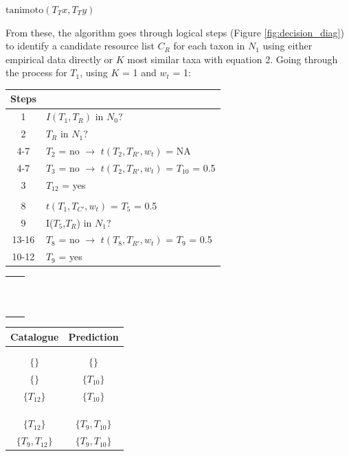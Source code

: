 \documentclass[letterpaper]{article}
\begin{document}
    \centerline{$\mbox{tanimoto}(T_Tx, T_Ty)$}
\bigskip

From these, the algorithm goes through logical steps (Figure \ref{fig:decision_diag}) to identify a candidate resource list $C_R$ for each taxon in $N_1$ using either empirical data directly or $K$ most similar taxa with equation 2. Going through the process for $T_1$, using $K$ = 1 and $w_t$ = 1:
\bigskip

\begin{table}[h!]
  \centering
  \small
  \begin{tabular}{cl}
      Steps \\
      \hline
      1        &$I(T_1,T_R)$ in $N_0$? \\
      2        &$T_R$ in $N_1$? \\
      4-7      &$T_2$ = no $\rightarrow$ $t(T_2, T_{R'}, w_t)$ = NA   \\
      4-7      &$T_3$ = no $\rightarrow$ $t(T_2, T_{R'}, w_t)$ = $T_{10}$ = 0.5 \\
      3        &$T_{12}$ = yes    \\  \\
      8        &$t(T_1, T_{C'}, w_t)$ = $T_5$ = 0.5            \\
      9        &I($T_5$,$T_R$) in $N_1$? \\
      13-16    &$T_8$ = no $\rightarrow$ $t(T_8, T_{R'}, w_t)$ = $T_9$ = 0.5  \\
      10-12    &$T_9$ = yes   \\
  \end{tabular}
  \begin{tabular}{c|c}
     & \\  \\  \\  \\  \\  \\  \\  \\  \\  \\  \\
  \end{tabular}
  \begin{tabular}{cc}
      Catalogue   & Prediction \\
      \hline \\ \\
      $\{\}$    & $\{\}$            \\
      $\{\}$    & $\{T_{10}\}$      \\
      $\{T_{12}\}$    & $\{T_{10}\}$      \\  \\  \\ \\
      $\{T_{12}\}$    & $\{T_9, T_{10}\}$      \\
      $\{T_9, T_{12}\}$    & $\{T_9, T_{10}\}$      \\
  \end{tabular}
\end{table}
\bigskip
\end{document}
